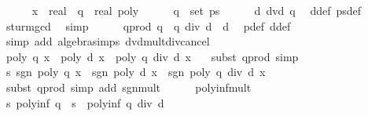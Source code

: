 \begin{isabellebody}
\isanewline
\ \ \ \ \isamarkupfalse%
\ x\ {\isacharcolon}{\isacharcolon}\ real\ \ q\ {\isacharcolon}{\isacharcolon}\ {\isachardoublequoteopen}real\ poly{\isachardoublequoteclose}\isanewline
\ \ \ \ \isamarkupfalse%
\ {\isachardoublequoteopen}q\ {\isasymin}\ set\ ps{\isachardoublequoteclose}\isanewline
\ \ \ \ \isamarkupfalse%
\ {\isachardoublequoteopen}d\ dvd\ q{\isachardoublequoteclose}\ \isamarkupfalse%
\ d{\isacharunderscore}def\ ps{\isacharunderscore}def\ \isamarkupfalse%
\ sturm{\isacharunderscore}gcd\ \isamarkupfalse%
\ simp\isanewline
\ \ \ \ \isamarkupfalse%
\ q{\isacharunderscore}prod{\isacharcolon}\ {\isachardoublequoteopen}q\ {\isacharequal}\ {\isacharparenleft}q\ div\ d{\isacharparenright}\ {\isacharasterisk}\ d{\isachardoublequoteclose}\ \isamarkupfalse%
\ p{\isacharprime}{\isacharunderscore}def\ d{\isacharunderscore}def\isanewline
\ \ \ \ \ \ \ \ \isamarkupfalse%
\ {\isacharparenleft}simp\ add{\isacharcolon}\ algebra{\isacharunderscore}simps\ dvd{\isacharunderscore}mult{\isacharunderscore}div{\isacharunderscore}cancel{\isacharparenright}\isanewline
\isanewline
\ \ \ \ \isamarkupfalse%
\ {\isachardoublequoteopen}poly\ q\ x\ {\isacharequal}\ poly\ d\ x\ {\isacharasterisk}\ poly\ {\isacharparenleft}q\ div\ d{\isacharparenright}\ x{\isachardoublequoteclose}\ \ \isamarkupfalse%
\ {\isacharparenleft}subst\ q{\isacharunderscore}prod{\isacharcomma}\ simp{\isacharparenright}\isanewline
\ \ \ \ \isamarkupfalse%
\ s{}{\isacharcolon}\ {\isachardoublequoteopen}sgn\ {\isacharparenleft}poly\ q\ x{\isacharparenright}\ {\isacharequal}\ sgn\ {\isacharparenleft}poly\ d\ x{\isacharparenright}\ {\isacharasterisk}\ sgn\ {\isacharparenleft}poly\ {\isacharparenleft}q\ div\ d{\isacharparenright}\ x{\isacharparenright}{\isachardoublequoteclose}\ \isanewline
\ \ \ \ \ \ \ \ \isamarkupfalse%
\ {\isacharparenleft}subst\ q{\isacharunderscore}prod{\isacharcomma}\ simp\ add{\isacharcolon}\ sgn{\isacharunderscore}mult{\isacharparenright}\isanewline
\ \ \ \ \isamarkupfalse%
\ poly{\isacharunderscore}inf{\isacharunderscore}mult\ \isamarkupfalse%
\ s{}{\isacharcolon}\ {\isachardoublequoteopen}poly{\isacharunderscore}inf\ q\ {\isacharequal}\ s{\isacharprime}\ {\isacharasterisk}\ poly{\isacharunderscore}inf\ {\isacharparenleft}q\ div\ d{\isacharparenright}{\isachardoublequoteclose}\isanewline

\end{isabellebody}
